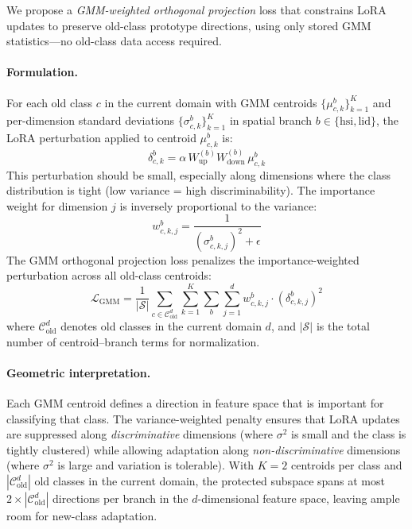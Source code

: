 We propose a \emph{GMM-weighted orthogonal projection} loss that constrains LoRA updates to preserve old-class prototype directions, using only stored GMM statistics---no old-class data access required.

\paragraph{Formulation.}
For each old class $c$ in the current domain with GMM centroids $\{\mu_{c,k}^b\}_{k=1}^{K}$ and per-dimension standard deviations $\{\sigma_{c,k}^b\}_{k=1}^{K}$ in spatial branch $b \in \{\mathrm{hsi}, \mathrm{lid}\}$, the LoRA perturbation applied to centroid $\mu_{c,k}^b$ is:
\begin{equation}
    \delta_{c,k}^b = \alpha\, W_{\mathrm{up}}^{(b)} W_{\mathrm{down}}^{(b)}\, \mu_{c,k}^b
\label{eq:gmm_perturbation}
\end{equation}
This perturbation should be small, especially along dimensions where the class distribution is tight (low variance = high discriminability).
The importance weight for dimension $j$ is inversely proportional to the variance:
\begin{equation}
    w_{c,k,j}^b = \frac{1}{(\sigma_{c,k,j}^b)^2 + \epsilon}
\label{eq:importance_weight}
\end{equation}
The GMM orthogonal projection loss penalizes the importance-weighted perturbation across all old-class centroids:
\begin{equation}
    \mathcal{L}_{\mathrm{GMM}} = \frac{1}{|\mathcal{S}|} \sum_{c \in \mathcal{C}_{\mathrm{old}}^d} \sum_{k=1}^{K} \sum_{b} \sum_{j=1}^{d} w_{c,k,j}^b \cdot (\delta_{c,k,j}^b)^2
\label{eq:gmm_loss}
\end{equation}
where $\mathcal{C}_{\mathrm{old}}^d$ denotes old classes in the current domain $d$, and $|\mathcal{S}|$ is the total number of centroid--branch terms for normalization.

\paragraph{Geometric interpretation.}
Each GMM centroid defines a direction in feature space that is important for classifying that class.
The variance-weighted penalty ensures that LoRA updates are suppressed along \emph{discriminative} dimensions (where $\sigma^2$ is small and the class is tightly clustered) while allowing adaptation along \emph{non-discriminative} dimensions (where $\sigma^2$ is large and variation is tolerable).
With $K{=}2$ centroids per class and $|\mathcal{C}_{\mathrm{old}}^d|$ old classes in the current domain, the protected subspace spans at most $2 \times |\mathcal{C}_{\mathrm{old}}^d|$ directions per branch in the $d$-dimensional feature space, leaving ample room for new-class adaptation.

